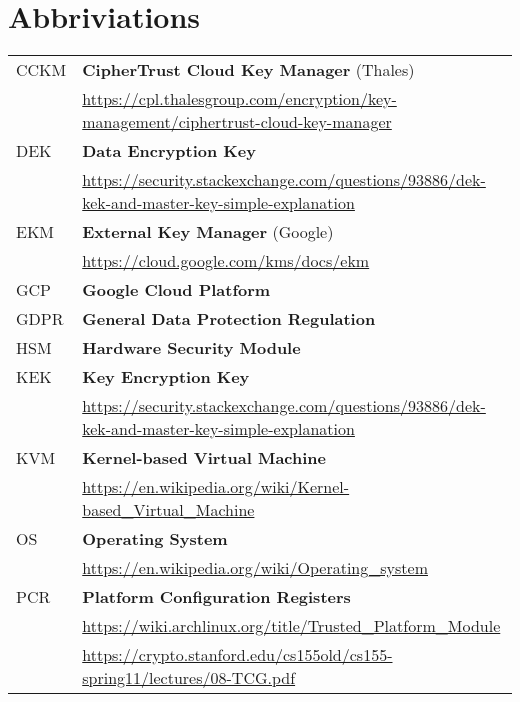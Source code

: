 
\section{Abbriviations}

\begin{tabular}{ ll }

CCKM
&  
\textbf{CipherTrust Cloud Key Manager }(Thales)\\
 & 
{\footnotesize\url{https://cpl.thalesgroup.com/encryption/key-management/ciphertrust-cloud-key-manager}} 
\\

DEK
&
\textbf{Data Encryption Key}\\
 & 
{\footnotesize\url{https://security.stackexchange.com/questions/93886/dek-kek-and-master-key-simple-explanation} }
\\

EKM
&
\textbf{External Key Manager} (Google)\\
 & 
{\footnotesize\url{https://cloud.google.com/kms/docs/ekm} }
\\

GCP
&
\textbf{Google Cloud Platform}
\\

GDPR
&
\textbf{General Data Protection Regulation}
\\

HSM
&
\textbf{Hardware Security Module} 
\\

KEK
&
\textbf{Key Encryption Key}\\
 & 
{\footnotesize\url{https://security.stackexchange.com/questions/93886/dek-kek-and-master-key-simple-explanation} }
\\ 

KVM
&
\textbf{Kernel-based Virtual Machine}\\
 & 
{\footnotesize\url{https://en.wikipedia.org/wiki/Kernel-based_Virtual_Machine} }
\\

OS
&
\textbf{Operating System}\\
 & 
{\footnotesize\url{https://en.wikipedia.org/wiki/Operating_system} }
\\

PCR
&
\textbf{Platform Configuration Registers }\\
 & 
{\footnotesize\url{https://wiki.archlinux.org/title/Trusted_Platform_Module}}\\
 & 
{\footnotesize\url{https://crypto.stanford.edu/cs155old/cs155-spring11/lectures/08-TCG.pdf} }
\\


\end{tabular}
